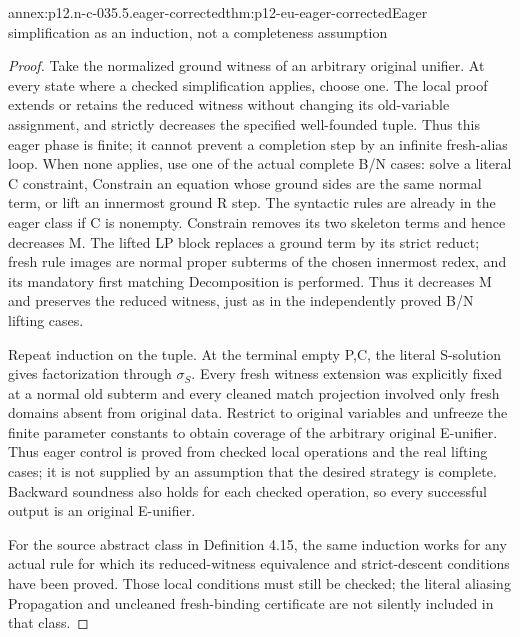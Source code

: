 \begin{annexitem}{annex:p12.n-c-035.5.eager-corrected}{thm:p12-eu-eager-corrected}{Eager simplification as an induction, not a completeness assumption}
\begin{proof}
Take the normalized ground witness of an arbitrary original unifier.
At every state where a checked simplification applies, choose one.
The local proof extends or retains the reduced witness without
changing its old-variable assignment, and strictly decreases the
specified well-founded tuple. Thus this eager phase is finite;
it cannot prevent a completion step by an infinite fresh-alias loop.
When none applies, use one of the actual complete B/N cases:
solve a literal C constraint, Constrain an equation whose ground
sides are the same normal term, or lift an innermost ground R step.
The syntactic rules are already in the eager class if C is nonempty.
Constrain removes its two skeleton terms and hence decreases M.
The lifted LP block replaces a ground term by its strict reduct;
fresh rule images are normal proper subterms of the chosen innermost
redex, and its mandatory first matching Decomposition is performed.
Thus it decreases M and preserves the reduced witness, just as in
the independently proved B/N lifting cases.

Repeat induction on the tuple. At the terminal empty P,C, the
literal S-solution gives factorization through \(\sigma_S\).
Every fresh witness extension was explicitly fixed at a normal
old subterm and every cleaned match projection involved only fresh
domains absent from original data. Restrict to original variables
and unfreeze the finite parameter constants to obtain coverage of
the arbitrary original E-unifier. Thus eager control is proved
from checked local operations and the real lifting cases; it is
not supplied by an assumption that the desired strategy is complete.
Backward soundness also holds for each checked operation, so every
successful output is an original E-unifier.

For the source abstract class in Definition 4.15, the same induction
works for any actual rule for which its reduced-witness equivalence
and strict-descent conditions have been proved. Those local conditions
must still be checked; the literal aliasing Propagation and uncleaned
fresh-binding certificate are not silently included in that class.
\end{proof}
\end{annexitem}

